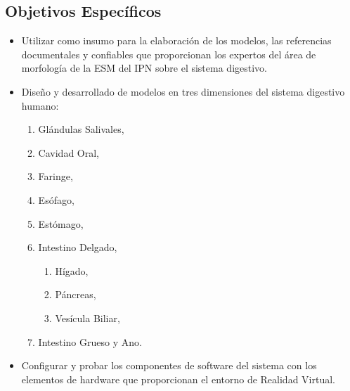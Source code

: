 \subsection{Objetivos Específicos}
\begin{itemize}
	\item Utilizar como insumo para la elaboración de los modelos, las referencias documentales y confiables que proporcionan los expertos del área de morfología de la ESM del IPN sobre el sistema digestivo.
	\item Diseño y desarrollado de modelos en tres dimensiones del sistema digestivo humano:
	\begin{enumerate}
		\item Glándulas Salivales,
		\item Cavidad Oral,
		\item Faringe,
		\item Esófago,
		\item Estómago,
		\item Intestino Delgado,
		\begin{enumerate}
		  \item Hígado,
		  \item Páncreas,
		  \item Vesícula Biliar,
		\end{enumerate}
		\item Intestino Grueso y Ano.
	\end{enumerate}
		\item Configurar y probar los componentes de software del sistema con los elementos de hardware que proporcionan el entorno de  Realidad Virtual.	
\end{itemize}

